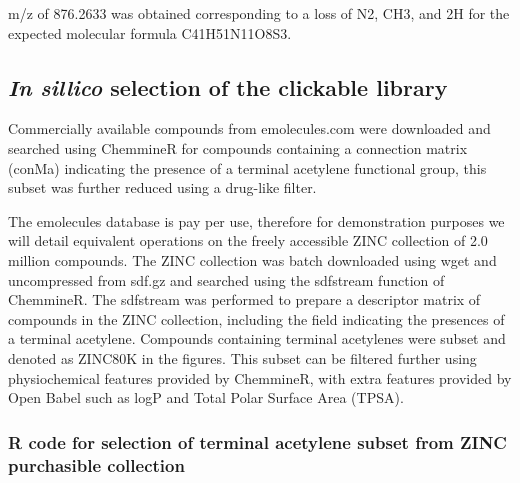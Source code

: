 \noindent 
m/z of 876.2633 was obtained corresponding to a loss of N2, CH3, and 2H for the expected molecular formula C41H51N11O8S3. \\


\subsection{{\it In sillico} selection of the clickable library}

Commercially available compounds from emolecules.com were downloaded and searched using ChemmineR for compounds containing a connection matrix (conMa) indicating the presence of a terminal acetylene functional group, this subset was further reduced using a drug-like filter. 

The emolecules database is pay per use, therefore for demonstration purposes we will detail equivalent operations on the freely accessible ZINC collection of 2.0 million compounds. The ZINC collection was batch downloaded using wget and uncompressed from sdf.gz and searched using the sdfstream function of ChemmineR. The sdfstream was performed to prepare a descriptor matrix of compounds in the ZINC collection, including the field indicating the presences of a terminal acetylene. Compounds containing terminal acetylenes were subset and denoted as ZINC80K in the figures. This subset can be filtered further using physiochemical features provided by ChemmineR, with extra features provided by Open Babel such as logP and Total Polar Surface Area (TPSA).


\subsubsection{R code for selection of terminal acetylene subset from ZINC purchasible collection}

